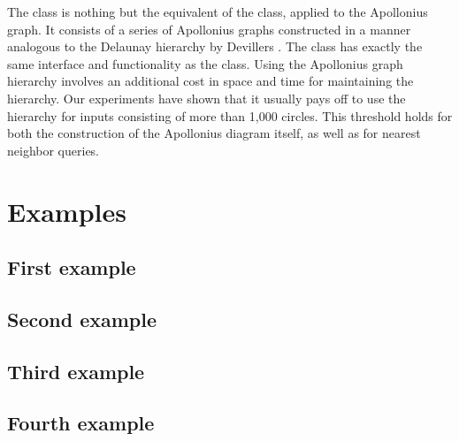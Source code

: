 The
class is nothing but the equivalent of the 
class, applied to the Apollonius graph. It consists of a series of
Apollonius graphs constructed in a manner analogous to the Delaunay
hierarchy by Devillers \cite{d-iirdt-98}. The class
has exactly the same interface and functionality as the
class. Using the Apollonius graph hierarchy involves an additional
cost in space and time for maintaining the hierarchy. Our experiments
have shown that it usually pays off to use the hierarchy for inputs
consisting of more than 1,000 circles. This threshold holds for both
the construction of the Apollonius diagram itself, as well as for
nearest neighbor queries.


\section{Examples}
\label{sec:apollonius2-examples}

\subsection{First example}

\subsection{Second example}

\subsection{Third example}

\subsection{Fourth example}
